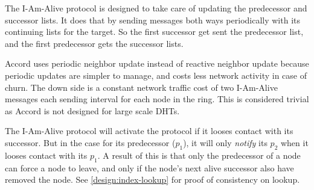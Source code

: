 The I-Am-Alive protocol is designed to take care of updating the predecessor and
 successor lists. It does that by sending messages both ways periodically with its
 continuing lists for the target. So the first successor get sent the predecessor
 list, and the first predecessor gets the successor lists.

Accord uses periodic neighbor update instead of reactive neighbor update because
 periodic updates are simpler to manage, and costs less network activity in case of
 churn. The down side is a constant network traffic cost of two I-Am-Alive messages
 each sending interval for each node in the ring. This is considered trivial as
 Accord is not designed for large scale DHTs.

The I-Am-Alive protocol will activate the  protocol if it looses contact
 with its successor. But in the case for its predecessor ($p_1$), it will only
 \emph{notify} its $p_2$ when it
 looses contact with its $p_1$. A result of this is that only the predecessor of a
 node can force a node to leave, and only if the node's next alive successor also have removed
 the node. See \ref{design:index-lookup} for proof of consistency on lookup.


